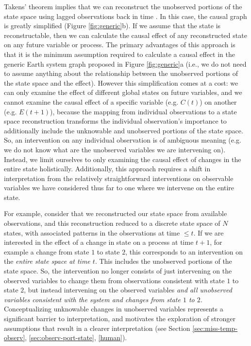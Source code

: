 \documentclass[12pt]{article}
\begin{document}
Takens' theorem implies that we can reconstruct the unobserved
portions of the state space using lagged observations back in time
\citep{takens1981detecting,deyle2011generalized,Sugihara496}. In this
case, the causal graph is greatly simplified (Figure
\ref{fig:generic}b). If we assume that the state is reconstructable,
then we can calculate the causal effect of any reconstructed state on
any future variable or process. The primary advantages of this
approach is that it is the minimum assumption required to calculate a
causal effect in the generic Earth system graph proposed in Figure
\ref{fig:generic}a (i.e., we do not need to assume anything about the
relationship between the unobserved portions of the state space and
the effect). However this simplification comes at a cost: we can only
examine the effect of different global states on future variables, and
we cannot examine the causal effect of a specific variable
(e.g. $C(t)$) on another (e.g. $E(t+1)$), because the mapping from
individual observations to a state space reconstruction transforms the
individual observation's importance to additionally include the
unknowable and unobserved portions of the state space. So, an
intervention on any individual observation is of ambiguous meaning
(e.g. we do not know what are the unobserved variables we are
intervening on). Instead, we limit ourselves to only examining the
causal effect of changes in the entire state
holistically. Additionally, this approach requires a shift in
interpretation from the relatively straightforward interventions on
observable variables we have considered thus far to one where we
intervene on the entire state.

For example, consider that we reconstructed our state space from
available observations, and this reconstruction reduced to a discrete
state space of $N$ states, with associated patterns in the observations
at time $\leq t$. If we are interested in the effect of a change in
state on a process at time $t+1$, for example a change from state $1$
to state $2$, this corresponds to an intervention on the
\textit{entire state space at time $t$}. This includes the unobserved
portions of the state space. So, the intervention no longer consists
of just intervening on the observed variables to change them from
observations consistent with state $1$ to state $2$, but instead
intervening on the observed variables \emph{and all unobserved
  variables consistent with the system and changes from state $1$ to
  $2$.}  Conceptualizing unknowable changes in unobserved variables
represents a significant barrier to interpretation, and motivates the
exploration of stronger assumptions that result in a clearer
interpretation (see Section \ref{sec:miss-temp-observ},
\ref{sec:observ-port-state}, \ref{human}).
\end{document}
